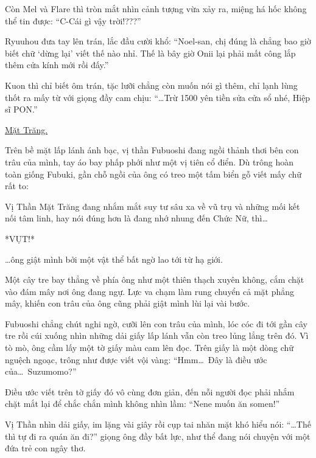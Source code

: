 \documentclass[../main.tex]{subfiles}
\begin{document}
Còn Mel và Flare thì tròn mắt nhìn cảnh tượng vừa xảy ra, miệng há hốc không thể tin được: ``C-Cái gì vậy trời!???''

Ryuuhou đưa tay lên trán, lắc đầu cười khổ: ``Noel-san, chị đúng là chẳng bao giờ biết chữ `dừng lại' viết thế nào nhỉ. Thế là bây giờ Onii lại phải mất công lắp thêm cửa kính mới rồi đấy.''

Kuon thì chỉ biết ôm trán, tặc lưỡi chẳng còn muốn nói gì thêm, chỉ lạnh lùng thốt ra mấy từ với giọng đầy cam chịu: ``\dots Trừ 1500 yên tiền sửa cửa sổ nhé, Hiệp sĩ PON.''

\begin{center}
  \uline{Mặt Trăng.}
\end{center}

Trên bề mặt lấp lánh ánh bạc, vị thần Fubuoshi đang ngồi thảnh thơi bên con trâu của mình, tay áo bay phấp phới như một vị tiên cổ điển. Dù trông hoàn toàn giống Fubuki, gần chỗ ngồi của ông có treo một tấm biển gỗ viết mấy chữ rất to:


Vị Thần Mặt Trăng đang nhắm mắt suy tư sâu xa về vũ trụ và những mối kết nối tâm linh, hay nói đúng hơn là đang nhớ nhung đến Chức Nữ, thì\dots

*VỤT!*

\dots ông giật mình bởi một vật thể bất ngờ lao tới từ hạ giới.


Một cây tre bay thẳng về phía ông như một thiên thạch xuyên không, cắm chặt vào đám mây nơi ông đang ngự. Lực va chạm làm rung chuyển cả mặt phẳng mây, khiến con trâu của ông cũng phải giật mình lùi lại vài bước.

Fubuoshi chẳng chút nghi ngờ, cưỡi lên con trâu của mình, lóc cóc đi tới gần cây tre rồi cúi xuống nhìn những dải giấy lấp lánh vẫn còn treo lủng lẳng trên đó. Vì tò mò, ông cầm lấy một tờ giấy màu cam lên đọc. Trên giấy là một dòng chữ nguệch ngoạc, trông như được viết vội vàng: ``Hmm\dots\ Đây là điều ước của\dots\ Suzumomo?''

Điều ước viết trên tờ giấy đó vô cùng đơn giản, đến nỗi người đọc phải nhắm chặt mắt lại để chắc chắn mình không nhìn lầm: ``Nene muốn ăn somen!''

Vị Thần nhìn dải giấy, im lặng vài giây rồi cụp tai nhăn mặt khó hiểu nói: ``\dots Thế thì tự đi ra quán ăn đi?'' giọng ông đầy bất lực, như thể đang nói chuyện với một đứa trẻ con ngây thơ.
\end{document}
